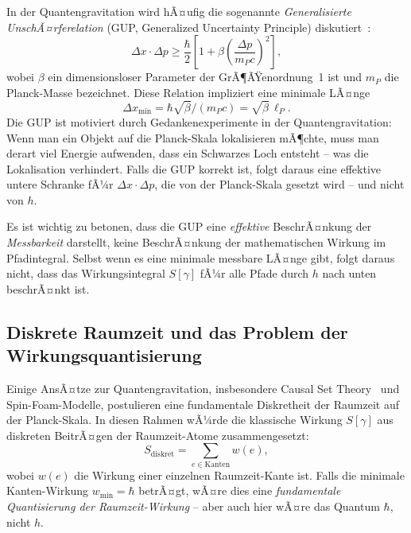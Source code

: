 ﻿\documentclass[12pt,a4paper]{article}
\theoremstyle{plain}
\theoremstyle{definition}
\theoremstyle{remark}
\begin{document}
In der Quantengravitation wird hÃ¤ufig die sogenannte \emph{Generalisierte UnschÃ¤rferelation}
(GUP, Generalized Uncertainty Principle) diskutiert~\cite{adler1999,maggiore1993}:
\begin{equation}
  \Delta x \cdot \Delta p \geq \frac{\hbar}{2}\left[1 + \beta\left(\frac{\Delta p}{m_P c}\right)^2\right],
  \label{eq:gup}
\end{equation}
wobei $\beta$ ein dimensionsloser Parameter der GrÃ¶ÃŸenordnung~1 ist und $m_P$ die
Planck-Masse bezeichnet. Diese Relation impliziert eine minimale LÃ¤nge
\begin{equation}
  \Delta x_{\min} = \hbar \sqrt{\beta} / (m_P c) = \sqrt{\beta}\,\ell_P.
\end{equation}
Die GUP ist motiviert durch Gedankenexperimente in der Quantengravitation: Wenn man
ein Objekt auf die Planck-Skala lokalisieren mÃ¶chte, muss man derart viel Energie
aufwenden, dass ein Schwarzes Loch entsteht -- was die Lokalisation verhindert. Falls
die GUP korrekt ist, folgt daraus eine effektive untere Schranke fÃ¼r
$\Delta x \cdot \Delta p$, die von der Planck-Skala gesetzt wird -- und nicht von $h$.

Es ist wichtig zu betonen, dass die GUP eine \emph{effektive} BeschrÃ¤nkung der
\emph{Messbarkeit} darstellt, keine BeschrÃ¤nkung der mathematischen Wirkung im
Pfadintegral. Selbst wenn es eine minimale messbare LÃ¤nge gibt, folgt daraus nicht,
dass das Wirkungsintegral $S[\gamma]$ fÃ¼r alle Pfade durch $h$ nach unten beschrÃ¤nkt ist.

\subsection{Diskrete Raumzeit und das Problem der Wirkungsquantisierung}

Einige AnsÃ¤tze zur Quantengravitation, insbesondere Causal Set Theory~\cite{bombelli1987}
und Spin-Foam-Modelle, postulieren eine fundamentale Diskretheit der Raumzeit auf der
Planck-Skala. In diesen Rahmen wÃ¼rde die klassische Wirkung $S[\gamma]$ aus
diskreten BeitrÃ¤gen der Raumzeit-Atome zusammengesetzt:
\begin{equation}
  S_{\mathrm{diskret}} = \sum_{e \in \text{Kanten}} w(e),
\end{equation}
wobei $w(e)$ die Wirkung einer einzelnen Raumzeit-Kante ist. Falls die minimale
Kanten-Wirkung $w_{\min} = \hbar$ betrÃ¤gt, wÃ¤re dies eine \emph{fundamentale Quantisierung
der Raumzeit-Wirkung} -- aber auch hier wÃ¤re das Quantum $\hbar$, nicht $h$.
\end{document}
